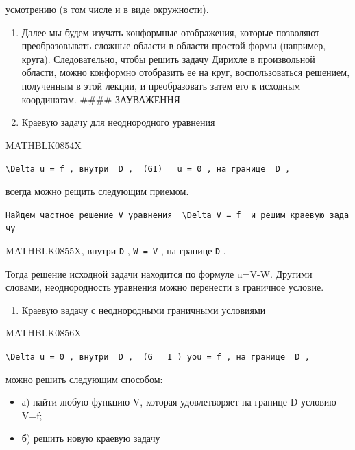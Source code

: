 \documentclass[
  ukrainian,
]{article}
\providecommand{\tightlist}{%
  \setlength{\itemsep}{0pt}\setlength{\parskip}{0pt}}
\begin{document}
усмотрению (в том числе и в виде окружности).

\begin{enumerate}
\def\labelenumi{\arabic{enumi}.}
\setcounter{enumi}{1}
\tightlist
\item
  Далее мы будем изучать конформные отображения, которые позволяют
  преобразовывать сложные области в области простой формы (например,
  круга). Следовательно, чтобы решить задачу Дирихле в произвольной
  области, можно конформно отобразить ее на круг, воспользоваться
  решением, полученным в этой лекции, и преобразовать затем его к
  исходным координатам. \#\#\#\# ЗАУВАЖЕННЯ
\item
  Краевую задачу для неоднородного уравнения
\end{enumerate}

MATHBLK0854X

\texttt{\textquotesingle{}\textbackslash{}Delta\ u\ =\ f\textquotesingle{}\ ,\ внутри\ \ \textquotesingle{}D\textquotesingle{}\ ,\ \ \textquotesingle{}(GI)\textquotesingle{}\ \ \ \textquotesingle{}u\ =\ 0\textquotesingle{}\ ,\ на\ границе\ \ \textquotesingle{}D\textquotesingle{}\ ,}

всегда можно рещить следующим приемом.

\texttt{Найдем\ частное\ решение\ V\ уравнения\ \ \textquotesingle{}\textbackslash{}Delta\ V\ =\ f\textquotesingle{}\ \ и\ решим\ краевую\ задачу}

MATHBLK0855X, внутри \texttt{D} , \texttt{W\ =\ V} , на границе
\texttt{D} .

Тогда решение исходной задачи находится по формуле u=V-W. Другими
словами, неоднородность уравнения можно перенести в граничное условие.

\begin{enumerate}
\def\labelenumi{\arabic{enumi}.}
\setcounter{enumi}{1}
\tightlist
\item
  Краевую вадачу с неоднородными граничными условиями
\end{enumerate}

MATHBLK0856X

\texttt{\textquotesingle{}\textbackslash{}Delta\ u\ =\ 0\textquotesingle{}\ ,\ внутри\ \ \textquotesingle{}D\textquotesingle{}\ ,\ \ \textquotesingle{}(G\textquotesingle{}\ \ \ \textquotesingle{}I\ )\ you\ =\ f\textquotesingle{}\ ,\ на\ границе\ \ \textquotesingle{}D\textquotesingle{}\ ,}

можно решить следующим способом:

\begin{itemize}
\tightlist
\item
  а) найти любую функцию V, которая удовлетворяет на границе D условию
  V=f;
\item
  б) решить новую краевую задачу
\end{itemize}
\end{document}
